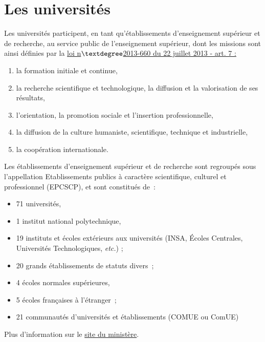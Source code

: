 \chapter{Les universit\'es}
\label{universite}
Les universit\'es participent, en tant qu'\'etablissements d'enseignement sup\'erieur et de recherche,
au service public de l'enseignement sup\'erieur, dont les missions sont ainsi d\'efinies par la 
 \href{https://www.legifrance.gouv.fr/affichCodeArticle.do?cidTexte=LEGITEXT000006071191&idArticle=LEGIARTI000027747739&dateTexte=20170113}{loi n$ \textdegree$2013-660 du 22 juillet 2013 - art. 7 :}
\begin{enumerate}
 \item la formation initiale et continue,
 \item la recherche scientifique et technologique, la diffusion et la valorisation de ses r\'esultats,
 \item l'orientation, la promotion sociale et l'insertion professionnelle,
 \item la diffusion de la culture humaniste, scientifique, technique et industrielle,
 \item  la coop\'eration internationale.
\end{enumerate}

\quad

Les \'etablissements d'enseignement sup\'erieur et de recherche sont regroup\'es sous l'appellation Etablissements publics \`a
caract\`ere scientifique, culturel et professionnel (EPCSCP), et sont constitu\'es de~:
\begin{itemize}
\item 71 universit\'es,
\item 1 institut national polytechnique,
\item 19 instituts et \'ecoles ext\'erieurs aux universit\'es (INSA, \'Ecoles Centrales, Universit\'es Technologiques, {\em etc.}) ;
\item 20 grands \'etablissements de statuts divers~;
\item 4 \'ecoles normales sup\'erieures,
\item 5 \'ecoles fran\c caises \`a l'\'etranger~;
\item 21 communaut\'es d'universit\'es et \'etablissements  (COMUE ou ComUE)
\end{itemize}
Plus d'information sur le \href{http://www.enseignementsup-recherche.gouv.fr/cid20263/index.html}{site du minist\`ere}.\\


